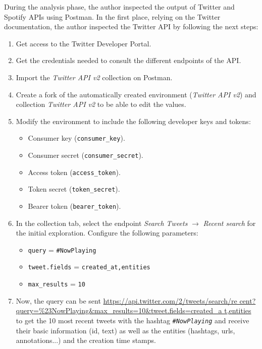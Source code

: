 \nonzeroparskip During the analysis phase, the author inspected the output of Twitter and Spotify APIs using Postman. In the first place, relying on the Twitter documentation, the author inspected the Twitter API by following the next steps:
\begin{enumerate}
	\item Get access to the Twitter Developer Portal.
	\item Get the credentials needed to consult the different endpoints of the API.
	\item Import the \textit{Twitter API v2} collection on Postman.
	\item Create a fork of the automatically created environment (\textit{Twitter API v2}) and collection \textit{Twitter API v2} to be able to edit the values.
	\item Modify the environment to include the following developer keys and tokens:
	\begin{itemize}
		\item Consumer key (\texttt{consumer\_key}).
		\item Consumer secret (\texttt{consumer\_secret}).
		\item Access token (\texttt{access\_token}).
		\item Token secret (\texttt{token\_secret}).
		\item Bearer token (\texttt{bearer\_token}).
	\end{itemize}
	\item In the collection tab, select the endpoint \textit{Search Tweets} $\longrightarrow$ \textit{Recent search} for the initial exploration. Configure the following parameters:
	\begin{itemize}
		\item \texttt{query} = \texttt{\#NowPlaying}
		\item \texttt{tweet.fields} = \texttt{created\_at,entities}
		\item \texttt{max\_results} = \texttt{10}
	\end{itemize}
	\item Now, the query can be sent \url{https://api.twitter.com/2/tweets/search/re cent?query=\%23NowPlaying\&max\_results=10\&tweet.fields=created\_a t,entities} to get the 10 most recent tweets with the hashtag \texttt{\textit{\#NowPlaying}} and receive their basic information (id, text) as well as the entities (hashtags, urls, annotations...) and the creation time stamps.
\end{enumerate}

